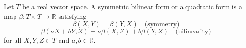 Let $T$ be a real vector space. A symmetric bilinear form or a quadratic form is a map $\beta: T \times T \to \mathbb{R}$ satisfying
$$\beta(X, Y) = \beta(Y, X) \quad \text{(symmetry)}$$
$$\beta(aX + bY, Z) = a\beta(X, Z) + b\beta(Y, Z) \quad \text{(bilinearity)}$$
for all $X, Y, Z \in T$ and $a, b \in \mathbb{R}$.
